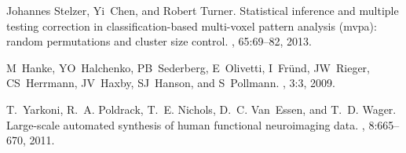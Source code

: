 \documentclass[10pt,a4paper,twocolumn]{article}
\begin{document}
\begin{thebibliography}{10}
Johannes Stelzer, Yi~Chen, and Robert Turner.
\newblock Statistical inference and multiple testing correction in
  classification-based multi-voxel pattern analysis (mvpa): random permutations
  and cluster size control.
, 65:69--82, 2013.

M~Hanke, YO~Halchenko, PB~Sederberg, E~Olivetti, I~Fründ, JW~Rieger,
  CS~Herrmann, JV~Haxby, SJ~Hanson, and S~Pollmann.
, 3:3, 2009.

T.~Yarkoni, R.~A. Poldrack, T.~E. Nichols, D.~C. Van~Essen, and T.~D. Wager.
\newblock Large-scale automated synthesis of human functional neuroimaging
  data.
, 8:665--670, 2011.

\end{thebibliography}
\end{document}
